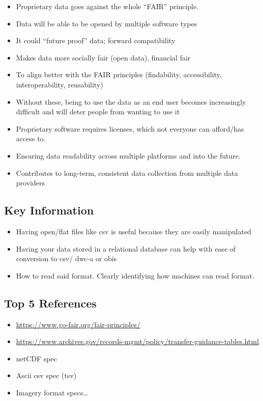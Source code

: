 \documentclass[
  oneside]{book}
\providecommand{\tightlist}{%
  \setlength{\itemsep}{0pt}\setlength{\parskip}{0pt}}
\begin{document}
\begin{itemize}
\tightlist
\item
  Proprietary data goes against the whole ``FAIR'' principle.
\item
  Data will be able to be opened by multiple software types
\item
  It could ``future proof'' data; forward compatibility
\item
  Makes data more socially fair (open data), financial fair
\item
  To align better with the FAIR principles (findability, accessibility, interoperability, reusability)
\item
  Without these, being to use the data as an end user becomes increasingly difficult and will deter people from wanting to use it
\item
  Proprietary software requires licenses, which not everyone can afford/has access to.
\item
  Ensuring data readability across multiple platforms and into the future.
\item
  Contributes to long-term, consistent data collection from multiple data providers
\end{itemize}

\hypertarget{key-information}{%
\subsection{Key Information}\label{key-information}}

\begin{itemize}
\tightlist
\item
  Having open/flat files like csv is useful because they are easily manipulated
\item
  Having your data stored in a relational database can help with ease of conversion to csv/ dwc-a or obis
\item
  How to read said format. Clearly identifying how machines can read format.
\end{itemize}

\hypertarget{top-5-references}{%
\subsection{Top 5 References}\label{top-5-references}}

\begin{itemize}
\tightlist
\item
  \url{https://www.go-fair.org/fair-principles/}
\item
  \url{https://www.archives.gov/records-mgmt/policy/transfer-guidance-tables.html}
\item
  netCDF spec
\item
  Ascii csv spec (tsv)
\item
  Imagery format specs\ldots{}
\end{itemize}
\end{document}
